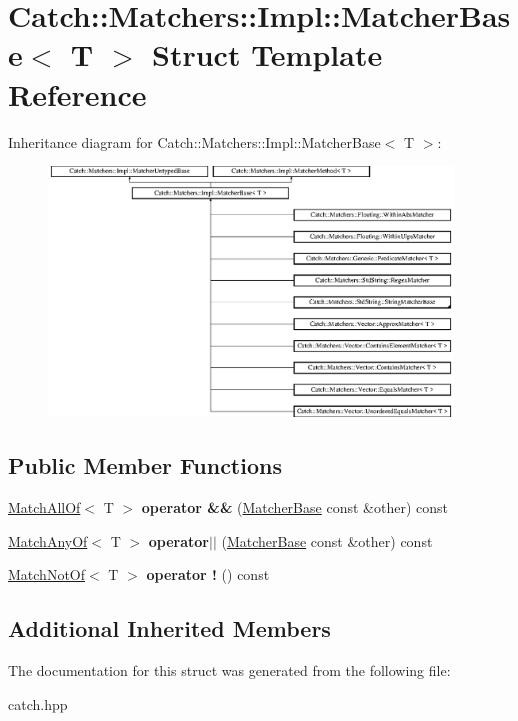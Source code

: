 \hypertarget{structCatch_1_1Matchers_1_1Impl_1_1MatcherBase}{}\section{Catch\+::Matchers\+::Impl\+::Matcher\+Base$<$ T $>$ Struct Template Reference}
\label{structCatch_1_1Matchers_1_1Impl_1_1MatcherBase}
Inheritance diagram for Catch\+::Matchers\+::Impl\+::Matcher\+Base$<$ T $>$\+:\begin{figure}[H]
\begin{center}
\leavevmode
\includegraphics[height=6.646884cm]{structCatch_1_1Matchers_1_1Impl_1_1MatcherBase}
\end{center}
\end{figure}
\subsection*{Public Member Functions}
\begin{DoxyCompactItemize}
\item 
\mbox{\label{structCatch_1_1Matchers_1_1Impl_1_1MatcherBase_aac4472c84f76c242ab4467f02e2ef8cc}} 
\mbox{\hyperlink{structCatch_1_1Matchers_1_1Impl_1_1MatchAllOf}{Match\+All\+Of}}$<$ T $>$ {\bfseries operator \&\&} (\mbox{\hyperlink{structCatch_1_1Matchers_1_1Impl_1_1MatcherBase}{Matcher\+Base}} const \&other) const
\item 
\mbox{\label{structCatch_1_1Matchers_1_1Impl_1_1MatcherBase_a5f8542b8f1567a6f9c65d0a6da7b679b}} 
\mbox{\hyperlink{structCatch_1_1Matchers_1_1Impl_1_1MatchAnyOf}{Match\+Any\+Of}}$<$ T $>$ {\bfseries operator$\vert$$\vert$} (\mbox{\hyperlink{structCatch_1_1Matchers_1_1Impl_1_1MatcherBase}{Matcher\+Base}} const \&other) const
\item 
\mbox{\label{structCatch_1_1Matchers_1_1Impl_1_1MatcherBase_ab2ca564bb42ceaf8dbaf3426583bb28e}} 
\mbox{\hyperlink{structCatch_1_1Matchers_1_1Impl_1_1MatchNotOf}{Match\+Not\+Of}}$<$ T $>$ {\bfseries operator !} () const
\end{DoxyCompactItemize}
\subsection*{Additional Inherited Members}


The documentation for this struct was generated from the following file\+:\begin{DoxyCompactItemize}
\item 
catch.\+hpp\end{DoxyCompactItemize}
